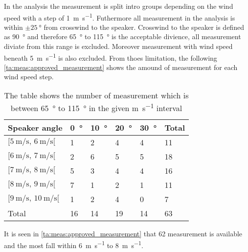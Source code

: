 
In the analysis the measurement is split intro groups depending on the wind speed with a step of \SI{1}{\meter\per\second}. Futhermore all measurement in the analysis is within $\pm\SI{25}{\degree}$ from crosswind to the speaker. Crosswind to the speaker is defined as \SI{90}{\degree} and therefore \SI{65}{\degree} to \SI{115}{\degree} is the acceptable divience, all measurement diviate from this range is excluded. Moreover measurement with wind speed beneath \SI{5}{\meter\per\second} is also excluded. From thoes limitation, the following \autoref{ta:meas:approved_measurement} shows the amound of measurement for each wind speed step. 

\begin{table}[H]
\centering
\caption{The table shows the number of measurement which is between \SI{65}{\degree} to \SI{115}{\degree} in the given \si{\meter\per\second} interval}
\begin{tabular}{l|l|l|l|l|l}
Speaker angle & \SI{0}{\degree}  & \SI{10}{\degree} & \SI{20}{\degree} & \SI{30}{\degree} & Total \\ \hline
$[\SI{5}{\meter\per\second},\, \SI{6}{\meter\per\second}[ $         & 1  & 2  & 4  & 4  & 11    \\
$[\SI{6}{\meter\per\second},\, \SI{7}{\meter\per\second}[$           & 2  & 6  & 5  & 5  & 18    \\
$[\SI{7}{\meter\per\second},\, \SI{8}{\meter\per\second}[ $          & 5  & 3  & 4  & 4  & 16    \\
$[\SI{8}{\meter\per\second},\, \SI{9}{\meter\per\second}[ $          & 7  & 1  & 2  & 1  & 11    \\
$[\SI{9}{\meter\per\second},\, \SI{10}{\meter\per\second}[  $        & 1  & 2  & 4  & 0  & 7     \\ \hline
Total         & 16 & 14 & 19 & 14 &   63   
\end{tabular}
\label{ta:meas:approved_measurement}
\end{table}

It is seen in \autoref{ta:meas:approved_measurement} that 62 measurement is available and the most fall within \SI{6}{\meter\per\second} to \SI{8}{\meter\per\second}.


